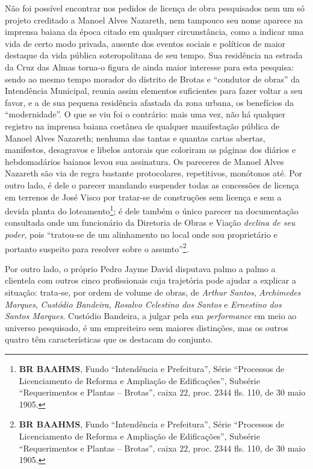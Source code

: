 Não foi possível encontrar nos pedidos de licença de obra pesquisados nem um só projeto creditado a Manoel Alves Nazareth, nem tampouco seu nome aparece na imprensa baiana da época citado em qualquer circunstância, como a indicar uma vida de certo modo privada, ausente dos eventos sociais e políticos de maior destaque da vida pública soteropolitana de seu tempo. Sua residência na estrada da Cruz das Almas torna-o figura de ainda maior interesse para esta pesquisa: sendo ao mesmo tempo morador do distrito de Brotas e ``condutor de obras'' da Intendência Municipal, reunia assim elementos suficientes para fazer voltar a seu favor, e a de sua pequena residência afastada da zona urbana, os benefícios da ``modernidade''. O que se viu foi o contrário: mais uma vez, não há qualquer registro na imprensa baiana coetânea de qualquer manifestação pública de Manoel Alves Nazareth; nenhuma das tantas e quantas cartas abertas, manifestos, desagravos e libelos autorais que coloriram as páginas dos diários e hebdomadários baianos levou sua assinatura. Os pareceres de Manoel Alves Nazareth são via de regra bastante protocolares, repetitivos, monótonos até. Por outro lado, é dele o parecer mandando suspender todas as concessões de licença em terrenos de José Visco por tratar-se de construções sem licença e sem a devida planta do loteamento\footnote{\textbf{BR BAAHMS}, Fundo ``Intendência e Prefeitura'', Série ``Processos de Licenciamento de Reforma e Ampliação de Edificações'', Subsérie ``Requerimentos e Plantas -- Brotas'', caixa 22, proc. 2344 fls. 110, de 30 maio 1905.}; é dele também o único parecer na documentação consultada onde um funcionário da Diretoria de Obras e Viação \textit{declina de seu poder}, pois ``tratou-se de um alinhamento no local onde sou proprietário e portanto suspeito para resolver sobre o assunto''\footnote{\textbf{BR BAAHMS}, Fundo ``Intendência e Prefeitura'', Série ``Processos de Licenciamento de Reforma e Ampliação de Edificações'', Subsérie ``Requerimentos e Plantas -- Brotas'', caixa 22, proc. 2344 fls. 110, de 30 maio 1905.}.

Por outro lado, o próprio Pedro Jayme David disputava palmo a palmo a clientela com outros cinco profissionais cuja trajetória pode ajudar a explicar a situação: trata-se, por ordem de volume de obras, de \textit{Arthur Santos}, \textit{Archimedes Marques}, \textit{Custódio Bandeira}, \textit{Rosalvo Celestino dos Santos} e \textit{Ernestino dos Santos Marques}. Custódio Bandeira, a julgar pela sua \textit{performance} em meio ao universo pesquisado, é um empreiteiro sem maiores distinções, mas os outros quatro têm características que os destacam do conjunto.

